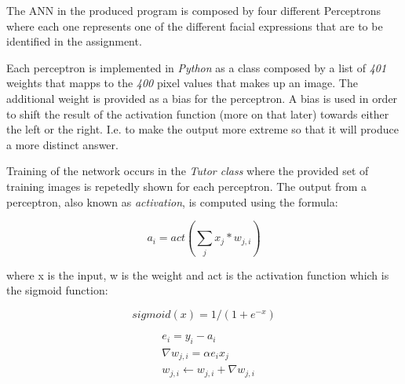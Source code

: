 \documentclass[12pt]{article}
\begin{document}
The ANN in the produced program is composed by four different Perceptrons
where each one represents one of the different facial expressions that are
to be identified in the assignment.

Each perceptron is implemented in \textit{Python} as a class composed by a
list of \textit{401} weights that mapps to the \textit{400} pixel values
that makes up an image. The additional weight is provided as a bias for
the perceptron. A bias is used in order to shift the result of the activation
function (more on that later) towards either the left or the right. I.e.
to make the output more extreme so that it will produce a more distinct
answer.

Training of the network occurs in the \textit{Tutor class} where the provided
set of training images is repetedly shown for each perceptron. The output
from a perceptron, also known as \textit{activation}, is computed using
the formula:

\begin{equation*}
  a_i = act(\sum_j x_j*w_{j,i})
\end{equation*}

where x is the input, w is the weight and act is the activation function
which is the sigmoid function:

\begin{equation*}
sigmoid(x) = 1/(1+e^{-x})
\end{equation*}

\begin{align*}
  &e_i = y_i - a_i\\
  &\nabla w_{j,i} = \alpha e_ix_j\\
  &w_{j,i} \leftarrow w_{j,i} + \nabla w_{j,i}
\end{align*}
  

\newpage
%
\end{document}
